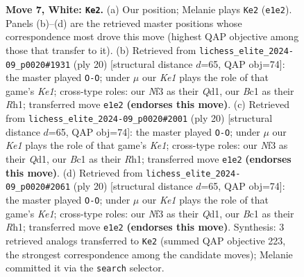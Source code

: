 \documentclass[11pt]{article}
\begin{document}
\begin{figure}[p]
\caption{\textbf{Move 7, White: \texttt{Ke2}.} (a) Our position; Melanie plays \texttt{Ke2} (\texttt{e1e2}). Panels (b)--(d) are the retrieved master positions whose correspondence most drove this move (highest QAP objective among those that transfer to it). (b) Retrieved from \texttt{lichess\_elite\_2024-09\_p0020\#1931} (ply 20) [structural distance $d$=65, QAP obj=74]: the master played \texttt{O-O}; under $\mu$ our \emph{Ke1} plays the role of that game's \emph{Ke1}; cross-type roles: our \emph{N}f3 as their \emph{Q}d1, our \emph{B}c1 as their \emph{R}h1; transferred move \texttt{e1e2} \textbf{(endorses this move)}. (c) Retrieved from \texttt{lichess\_elite\_2024-09\_p0020\#2001} (ply 20) [structural distance $d$=65, QAP obj=74]: the master played \texttt{O-O}; under $\mu$ our \emph{Ke1} plays the role of that game's \emph{Ke1}; cross-type roles: our \emph{N}f3 as their \emph{Q}d1, our \emph{B}c1 as their \emph{R}h1; transferred move \texttt{e1e2} \textbf{(endorses this move)}. (d) Retrieved from \texttt{lichess\_elite\_2024-09\_p0020\#2061} (ply 20) [structural distance $d$=65, QAP obj=74]: the master played \texttt{O-O}; under $\mu$ our \emph{Ke1} plays the role of that game's \emph{Ke1}; cross-type roles: our \emph{N}f3 as their \emph{Q}d1, our \emph{B}c1 as their \emph{R}h1; transferred move \texttt{e1e2} \textbf{(endorses this move)}. Synthesis: 3 retrieved analogs transferred to \texttt{Ke2} (summed QAP objective 223, the strongest correspondence among the candidate moves); Melanie committed it via the \texttt{search} selector.}
\label{fig:thought-m12}
\end{figure}

\clearpage
\end{document}
